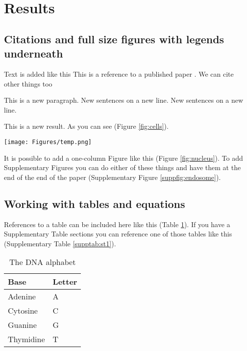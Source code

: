 \section*{Results}\label{s:results}

\subsection*{Citations and full size figures with legends underneath}

Text is added like this
This is a reference to a published paper \citep{watson_molecular_1953}.
We can cite other things too \citep{tipton_complexities_2019,zheng_genome_2011,alberts_molecular_2002}

This is a new paragraph.
New sentences on a new line.
New sentences on a new line.

This is a new result.
As you can see (Figure \ref{fig:cells}).

\begin{figure*}
\centering
\texttt{[image: Figures/temp.png]}
\caption{\textbf{These are cells.}\\
(\textbf{A}) This is a regular figure with a legend as a caption underneath. Inset: 3X zoom. Scale bar, \SI{10}{\micro\meter}.}
\label{fig:cells}
\end{figure*}

It is possible to add a one-column Figure like this (Figure \ref{fig:nucleus}).
To add Supplementary Figures you can do either of these things and have them at the end of the end of the paper (Supplementary Figure \ref{suppfig:endosome}).


\subsection*{Working with tables and equations}

References to a table can be included here like this (Table \ref{tab:t1}).
If you have a Supplementary Table sections you can reference one of those tables like this (Supplementary Table \ref{supptab:st1}).

\begin{table}[h] %
    \centering
    \begin{tabular}{l|l}
         Base & Letter\\
         \hline
         Adenine & A\\
         Cytosine & C\\
         Guanine & G\\
         Thymidine & T\\
    \end{tabular}
    \caption{The DNA alphabet}
    \label{tab:t1}
\end{table}

